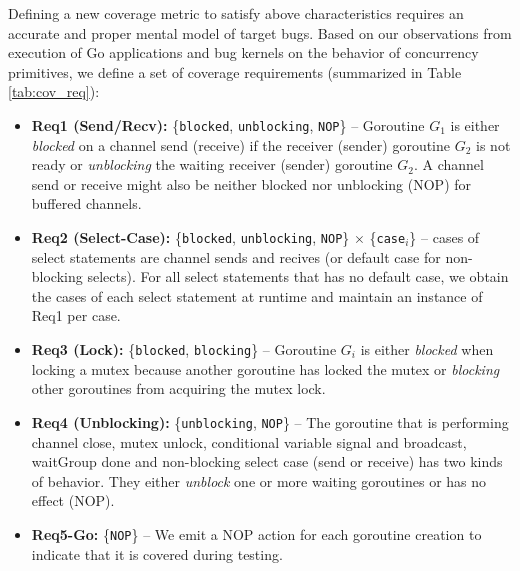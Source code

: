 Defining a new coverage metric to satisfy above characteristics requires an accurate and proper mental model of target bugs.
%
Based on our observations from execution of Go applications and bug kernels on the behavior of concurrency primitives, we define a set of coverage requirements (summarized in Table \ref{tab:cov_req}):
%
\begin{itemize}
  \item \textbf{Req1 (Send/Recv):} \{\texttt{blocked}, \texttt{unblocking}, \texttt{NOP}\} -- Goroutine $G_1$ is either \textit{blocked} on a channel send (receive) if the receiver (sender) goroutine $G_2$ is not ready or \textit{unblocking} the waiting receiver (sender) goroutine $G_2$. A channel send or receive might also be neither blocked nor unblocking (NOP) for buffered channels.
  \item \textbf{Req2 (Select-Case):} \{\texttt{blocked}, \texttt{unblocking}, \texttt{NOP}\} $\times$ \{\texttt{case}$_i$\} -- cases of select statements are channel sends and recives (or default case for non-blocking selects). For all select statements that has no default case, we obtain the cases of each select statement at runtime and maintain an instance of Req1 per case.
  \item \textbf{Req3 (Lock):} \{\texttt{blocked}, \texttt{blocking}\} -- Goroutine $G_i$ is either \textit{blocked} when locking a mutex because another goroutine has locked the mutex or \textit{blocking} other goroutines from acquiring the mutex lock.
  \item \textbf{Req4 (Unblocking):} \{\texttt{unblocking}, \texttt{NOP}\} -- The goroutine that is performing channel close, mutex unlock, conditional variable signal and broadcast, waitGroup done and non-blocking select case (send or receive) has two kinds of behavior. They either \textit{unblock} one or more waiting goroutines or has no effect (NOP).
  \item \textbf{Req5-Go:} \{\texttt{NOP}\} -- We emit a NOP action for each goroutine creation to indicate that it is covered during testing.
\end{itemize}


